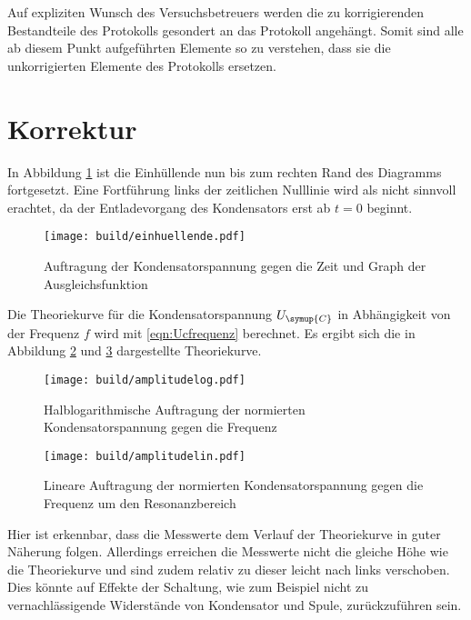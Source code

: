 \newpage
Auf expliziten Wunsch des Versuchsbetreuers werden die zu korrigierenden Bestandteile
des Protokolls gesondert an das Protokoll angehängt. Somit sind alle ab diesem Punkt
aufgeführten Elemente so zu verstehen, dass sie die unkorrigierten Elemente des
Protokolls ersetzen. 

\newpage
\section{Korrektur}
\label{sec:Korrektur}

In Abbildung \ref{fig:einhuellendefit} ist die Einhüllende nun bis zum rechten Rand
des Diagramms fortgesetzt. Eine Fortführung links der zeitlichen Nulllinie wird
als nicht sinnvoll erachtet, da der Entladevorgang des Kondensators erst ab $t=0$
beginnt.

\begin{figure}
  \centering
  \texttt{[image: build/einhuellende.pdf]}
  \caption{Auftragung der Kondensatorspannung gegen die Zeit und Graph der Ausgleichsfunktion}
  \label{fig:einhuellendefit}
\end{figure}

Die Theoriekurve für die Kondensatorspannung $U_{\symup{C}}$ in Abhängigkeit
von der Frequenz $f$ wird mit \eqref{eqn:Ucfrequenz} berechnet. Es ergibt sich die
in Abbildung \ref{fig:amplitudelog2} und \ref{fig:amplitudelin2} dargestellte
Theoriekurve.

\begin{figure}
  \centering
  \texttt{[image: build/amplitudelog.pdf]}
  \caption{Halblogarithmische Auftragung der normierten Kondensatorspannung
  gegen die Frequenz}
  \label{fig:amplitudelog2}
\end{figure}

\begin{figure}
  \centering
  \texttt{[image: build/amplitudelin.pdf]}
  \caption{Lineare Auftragung der normierten Kondensatorspannung gegen die
  Frequenz um den Resonanzbereich}
  \label{fig:amplitudelin2}
\end{figure}

Hier ist erkennbar, dass die Messwerte dem Verlauf der Theoriekurve in guter
Näherung folgen. Allerdings erreichen die Messwerte nicht die gleiche Höhe wie
die Theoriekurve und sind zudem relativ zu dieser leicht nach links verschoben.
Dies könnte auf Effekte der Schaltung, wie zum Beispiel nicht zu vernachlässigende
Widerstände von Kondensator und Spule, zurückzuführen sein.


